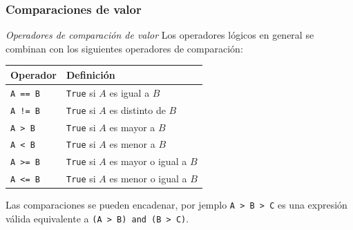 \documentclass{beamer}
\begin{document}
\begin{frame}[fragile]
    \frametitle{Comparaciones de valor}
    \begin{block}{{\em Operadores de comparación de valor}}
        Los operadores lógicos en general se combinan con los siguientes operadores de comparación:
        \begin{center}
            \begin{table}[]
                \begin{tabular}{@{}ll@{}}
                \toprule
                 Operador &  Definición \\ \midrule
                 \texttt{A == B} & \texttt{True} si $A$ es igual a $B$ \\
                 \texttt{A != B} & \texttt{True} si $A$ es distinto de $B$ \\
                 \texttt{A  > B} & \texttt{True} si $A$ es mayor a $B$ \\
                 \texttt{A  < B} & \texttt{True} si $A$ es menor a $B$ \\
                 \texttt{A >= B} & \texttt{True} si $A$ es mayor o igual a $B$ \\
                 \texttt{A <= B} & \texttt{True} si $A$ es menor o igual a $B$ \\
                 \bottomrule
                \end{tabular}
            \end{table}
        \end{center}
    Las comparaciones se pueden encadenar, por jemplo \texttt{A > B > C} es una expresión válida equivalente a \texttt{(A  > B) and (B > C)}.
    \end{block}
    \end{frame}

\end{document}
